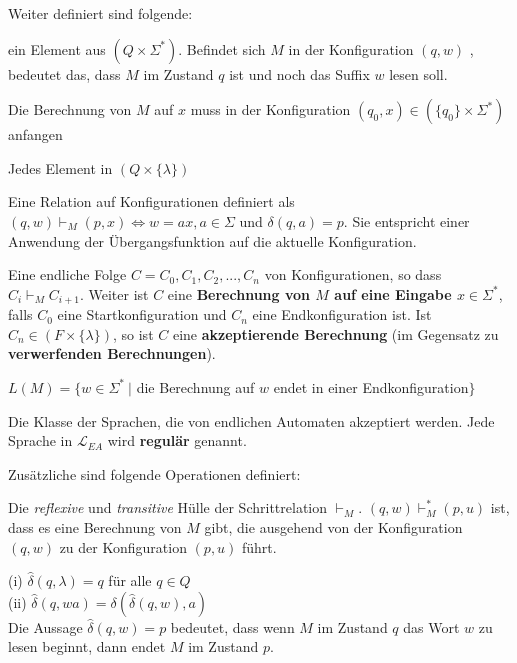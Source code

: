 \documentclass[11pt]{article}
\begin{document}
Weiter definiert sind folgende:
\begin{description}[labelindent=16pt,style=multiline,leftmargin=7.5cm, noitemsep]
	\item[Konfiguration:] ein Element aus $(Q \times \Sigma^*)$. Befindet sich $M$ in der Konfiguration $(q, w)$ , bedeutet das, dass $M$ im Zustand $q$ ist und noch das Suffix $w$ lesen soll.
	\item[Startkonfiguration:] Die Berechnung von $M$ auf $x$ muss in der Konfiguration $(q_0, x) \in (\{q_0\} \times \Sigma^*)$ anfangen
	\item[Endkonfiguration:] Jedes Element in $(Q \times \{\lambda\})$
	\item[Schritt:] Eine Relation auf Konfigurationen definiert als $(q,w) \vdash_M (p,x) \Leftrightarrow w = ax, a \in \Sigma$ und $\delta(q, a) = p$. Sie entspricht einer Anwendung der Übergangsfunktion auf die aktuelle Konfiguration.
	\item[Berechnung $C$:] Eine endliche Folge $C = C_0,C_1,C_2,...,C_n$ von Konfigurationen, so dass $C_i \vdash_M C_{i+1}$. Weiter ist $C$ eine \textbf{Berechnung von $M$ auf eine Eingabe $x \in \Sigma^*$}, falls $C_0$ eine Startkonfiguration und $C_n$ eine Endkonfiguration ist. Ist $C_n \in (F \times \{\lambda\})$, so ist $C$ eine \textbf{akzeptierende Berechnung} (im Gegensatz zu \textbf{verwerfenden Berechnungen}).
	\item[Akzpetierte Sprache $L(M)$:] $L(M) = \{ w \in \Sigma^*\ |$ die Berechnung auf $w$ endet in einer Endkonfiguration$\}$
	\item[Klasse der regulären Sprachen $\mathcal{L}_{EA}$:] Die Klasse der Sprachen, die von endlichen Automaten akzeptiert werden. Jede Sprache in $\mathcal{L}_{EA}$ wird \textbf{regulär} genannt.
\end{description}

Zusätzliche sind folgende Operationen definiert:
\begin{description}[labelindent=16pt,style=multiline,leftmargin=4.5cm, noitemsep]
	\item[$\vdash^*_M$:] Die \emph{reflexive} und \emph{transitive} Hülle der Schrittrelation $\vdash_M$. $(q,w) \vdash^*_M (p,u)$ ist, dass es eine Berechnung von $M$ gibt, die ausgehend von der Konfiguration $(q,w)$ zu der Konfiguration $(p,u)$ führt.
	\item[$\hat\delta: (Q \times \Sigma^*) \mapsto Q$:] (i) $\hat\delta(q,\lambda) = q$ für alle $q\in Q$ \\
	(ii) $\hat\delta(q, wa) = \delta(\hat\delta(q, w), a)$ \\
	Die Aussage $\hat\delta(q, w) = p$ bedeutet, dass wenn $M$ im Zustand $q$ das Wort $w$ zu lesen beginnt, dann endet $M$ im Zustand $p$.
\end{description}
	
\end{document}
